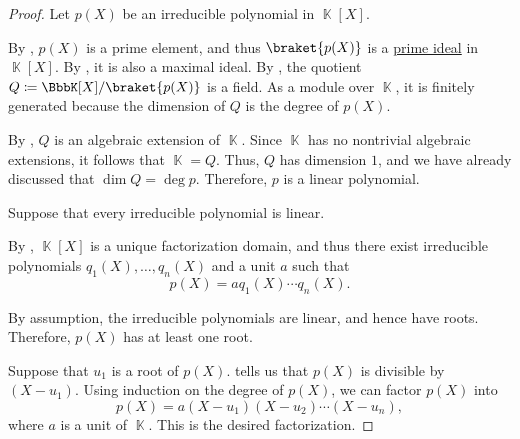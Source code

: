\begin{proof}
   Let \( p(X) \) be an irreducible polynomial in \( \BbbK[X] \).

  By , \( p(X) \) is a prime element, and thus \( \braket {p(X)} \) is a \hyperref[def:prime_ideal]{prime ideal} in \( \BbbK[X] \). By , it is also a maximal ideal. By , the quotient \( Q \coloneqq \BbbK[X] / \braket{ p(X) } \) is a field. As a module over \( \BbbK \), it is finitely generated because the dimension of \( Q \) is the degree of \( p(X) \).

  By , \( Q \) is an algebraic extension of \( \BbbK \). Since \( \BbbK \) has no nontrivial algebraic extensions, it follows that \( \BbbK = Q \). Thus, \( Q \) has dimension \( 1 \), and we have already discussed that \( \dim Q = \deg p \). Therefore, \( p \) is a linear polynomial.

   Suppose that every irreducible polynomial is linear.

  By , \( \BbbK[X] \) is a unique factorization domain, and thus there exist irreducible polynomials \( q_1(X), \ldots, q_n(X) \) and a unit \( a \) such that
  \begin{equation*}
    p(X) = a q_1(X) \cdots q_n(X).
  \end{equation*}

  By assumption, the irreducible polynomials are linear, and hence have roots. Therefore, \( p(X) \) has at least one root.

   Suppose that \( u_1 \) is a root of \( p(X) \).  tells us that \( p(X) \) is divisible by \( (X - u_1) \). Using induction on the degree of \( p(X) \), we can factor \( p(X) \) into
  \begin{equation*}
    p(X) = a (X - u_1) (X - u_2) \cdots (X - u_n),
  \end{equation*}
  where \( a \) is a unit of \( \BbbK \). This is the desired factorization.


\end{proof}
